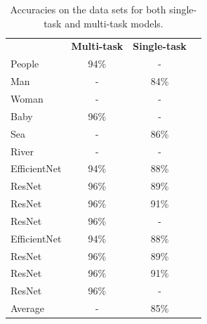 \begin{table}[]
    \centering
    \begin{tabular}{lccl}
        \multicolumn{1}{l}{\textbf{}}    & \multicolumn{1}{l}{\textbf{Multi-task}} & \multicolumn{1}{l}{\textbf{Single-task}} \\ \cline{2-3}
        \multicolumn{1}{l}{People} & \multicolumn{1}{c}{94\%}            & \multicolumn{1}{c}{-}                           \\ \hline
        \multicolumn{1}{l}{Man} & \multicolumn{1}{c}{-}               & \multicolumn{1}{c}{84\%}                        \\ \hline
        \multicolumn{1}{l}{Woman} & \multicolumn{1}{c}{-}               & \multicolumn{1}{c}{-}                           \\ \hline
        \multicolumn{1}{l}{Baby}       & \multicolumn{1}{c}{96\%}            & \multicolumn{1}{c}{-}                           \\ \hline
        \multicolumn{1}{l}{Sea}       & \multicolumn{1}{c}{-}               & \multicolumn{1}{c}{86\%}                        \\ \hline
        \multicolumn{1}{l}{River}       & \multicolumn{1}{c}{-}               & \multicolumn{1}{c}{-}                           \\ \hline
        \multicolumn{1}{l}{EfficientNet} & \multicolumn{1}{c}{94\%}            & \multicolumn{1}{c}{88\%}                        \\ \hline
        \multicolumn{1}{l}{ResNet}       & \multicolumn{1}{c}{96\%}            & \multicolumn{1}{c}{89\%}                        \\ \hline
        \multicolumn{1}{l}{ResNet}       & \multicolumn{1}{c}{96\%}            & \multicolumn{1}{c}{91\%}                        \\ \hline
        \multicolumn{1}{l}{ResNet}       & \multicolumn{1}{c}{96\%}            & \multicolumn{1}{c}{-}                           \\ \hline
        \multicolumn{1}{l}{EfficientNet} & \multicolumn{1}{c}{94\%}            & \multicolumn{1}{c}{88\%}                        \\ \hline
        \multicolumn{1}{l}{ResNet}       & \multicolumn{1}{c}{96\%}            & \multicolumn{1}{c}{89\%}                        \\ \hline
        \multicolumn{1}{l}{ResNet}       & \multicolumn{1}{c}{96\%}            & \multicolumn{1}{c}{91\%}                        \\ \hline
        \multicolumn{1}{l}{ResNet}       & \multicolumn{1}{c}{96\%}            & \multicolumn{1}{c}{-}                           \\ \hline
        \multicolumn{1}{l}{Average}       & \multicolumn{1}{c}{-}               & \multicolumn{1}{c}{85\%}                        \\ \hline
    \end{tabular}
    \caption{Accuracies on the data sets for both single-task and multi-task models.}
\end{table}

